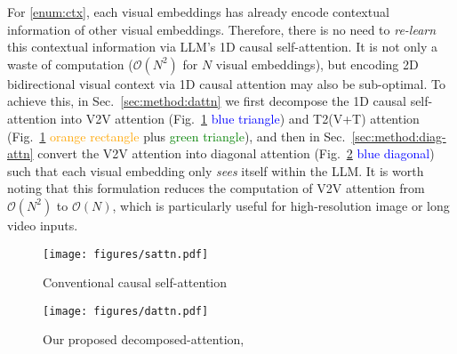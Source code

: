 For \ref{enum:ctx}, each visual embeddings has already encode contextual information of other visual embeddings.
Therefore, there is no need to \emph{re-learn} this contextual information via LLM's 1D causal self-attention.
It is not only a waste of computation ($\mathcal{O}(N^2)$ for $N$ visual embeddings), but encoding 2D bidirectional visual context via 1D causal attention may also be sub-optimal.
To achieve this, in Sec.~\ref{sec:method:dattn} we first decompose the 1D causal self-attention into V2V attention (Fig.~\ref{fig:sattn} \textcolor{blue}{blue triangle}) and T2(V+T) attention (Fig.~\ref{fig:sattn} \textcolor{orange}{orange rectangle} plus \textcolor{green}{green triangle}), and then in Sec.~\ref{sec:method:diag-attn} convert the V2V attention into diagonal attention (Fig.~\ref{fig:dattn} \textcolor{blue}{blue diagonal}) such that each visual embedding only \emph{sees} itself within the LLM.
It is worth noting that this formulation reduces the computation of V2V attention from $\mathcal{O}(N^2)$ to $\mathcal{O}(N)$, which is particularly useful for high-resolution image or long video inputs.

\begin{figure*}[t]
\centering
\begin{subfigure}{.49\linewidth}
  \centering
  \texttt{[image: figures/sattn.pdf]}
  \caption{Conventional causal self-attention}\label{fig:sattn}
\end{subfigure}
\hfill
\begin{subfigure}{.49\linewidth}
  \centering
  \texttt{[image: figures/dattn.pdf]}
  \caption{Our proposed decomposed-attention, \method{}}\label{fig:dattn}
\end{subfigure}
\caption{
Comparison between convention causal self-attention (Fig.~\ref{fig:sattn}) and our proposed decomposed-attention, \method{} (Fig.~\ref{fig:dattn}). \textcolor{blue}{Blue squares} represent visual embeddings while \textcolor{green}{green diamonds} represent textual embeddings.
Shaded areas represent non-zero attention, where \textcolor{blue}{blue}, \textcolor{orange}{orange}, and \textcolor{green}{green} are for V2V (visual-to-visual), T2V (textual-to-visual), and T2T (textual-to-textual) attention, respectively.
}\label{fig:attn}
\end{figure*}

